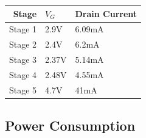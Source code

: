 \documentclass[11pt, twoside, letterpaper]{article}
\begin{document}
\begin{tabular}{|r|l|l|}
\hline
Stage & $V_{G}$ & Drain Current\\
\hline
Stage 1 &2.9V&6.09mA\\
Stage 2 &2.4V&6.2mA\\
Stage 3 &2.37V&5.14mA\\
Stage 4 &2.48V&4.55mA\\
Stage 5 &4.7V&41mA\\
\hline
\end{tabular}


\subsection*{Power Consumption}
\end{document}
